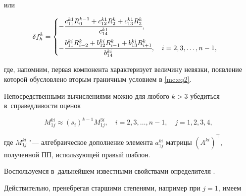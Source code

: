 или

\begin{equation}

\label{mc:eq39}

   \delta f_{h}^k=

\begin{cases}

-\cfrac{c_{11}^{k1} R_{0}^{k-1}+c_{12}^{k1} R_{2}^k+c_{13}^{k1} R_{3}^k}{c_{14}^{k1}},

\\[4mm]

-\cfrac{b_{11}^{ki} R_{i-2}^k+b_{12}^{ki} R_{i-1}^k+b_{13}^{ki} R_{i+1}^k}{b_{14}^{ki}}

,\quad    i=2,  3,  \dots,  n-1,

\end{cases}

\end{equation}

где, напомним, первая компонента характеризует величину невязки, появление которой обусловлено вторым граничным условием в \eqref{mc:eq2}.



Непосредственными вычислениями можно для любого $   k > 3$ убедиться в~справедливости оценок

\begin{equation}

\label{mc:eq40}

M_{1j}^{ki}\approx (s_i)^{k-1} M_{1j}^{3i},\quad i=2,  3,  \dots,  n-1,\quad j=1,  2,  3,  4,

\end{equation}

где $M_{1j}^{ki}$ "--- алгебраическое дополнение элемента $a_{1j}^{ki}$ матрицы $   (A^{ki})^\top$, полученной ПП, использующей правый шаблон. 

Воспользуемся в~дальнейшем известными свойствами определителя \cite{mc:bib15}. 

Действительно, пренебрегая старшими степенями, например при $   j=1$, имеем



